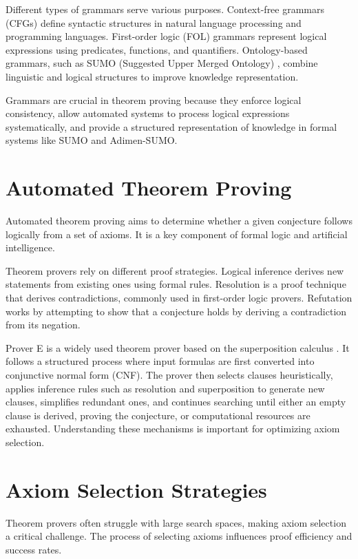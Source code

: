 \documentclass[english,version-2020-11]{uzl-thesis}
\begin{document}
Different types of grammars serve various purposes. Context-free grammars (CFGs) define syntactic structures in natural language processing and programming languages. First-order logic (FOL) grammars represent logical expressions using predicates, functions, and quantifiers. Ontology-based grammars, such as SUMO (Suggested Upper Merged Ontology) \cite{Niles2001}, combine linguistic and logical structures to improve knowledge representation.

Grammars are crucial in theorem proving because they enforce logical consistency, allow automated systems to process logical expressions systematically, and provide a structured representation of knowledge in formal systems like SUMO and Adimen-SUMO.

\section{Automated Theorem Proving}

Automated theorem proving aims to determine whether a given conjecture follows logically from a set of axioms. It is a key component of formal logic and artificial intelligence.

Theorem provers rely on different proof strategies. Logical inference derives new statements from existing ones using formal rules. Resolution is a proof technique that derives contradictions, commonly used in first-order logic provers. Refutation works by attempting to show that a conjecture holds by deriving a contradiction from its negation.

Prover E is a widely used theorem prover based on the superposition calculus \cite{Schulz2013}. It follows a structured process where input formulas are first converted into conjunctive normal form (CNF). The prover then selects clauses heuristically, applies inference rules such as resolution and superposition to generate new clauses, simplifies redundant ones, and continues searching until either an empty clause is derived, proving the conjecture, or computational resources are exhausted. Understanding these mechanisms is important for optimizing axiom selection.

\section{Axiom Selection Strategies}

Theorem provers often struggle with large search spaces, making axiom selection a critical challenge. The process of selecting axioms influences proof efficiency and success rates.
\end{document}
